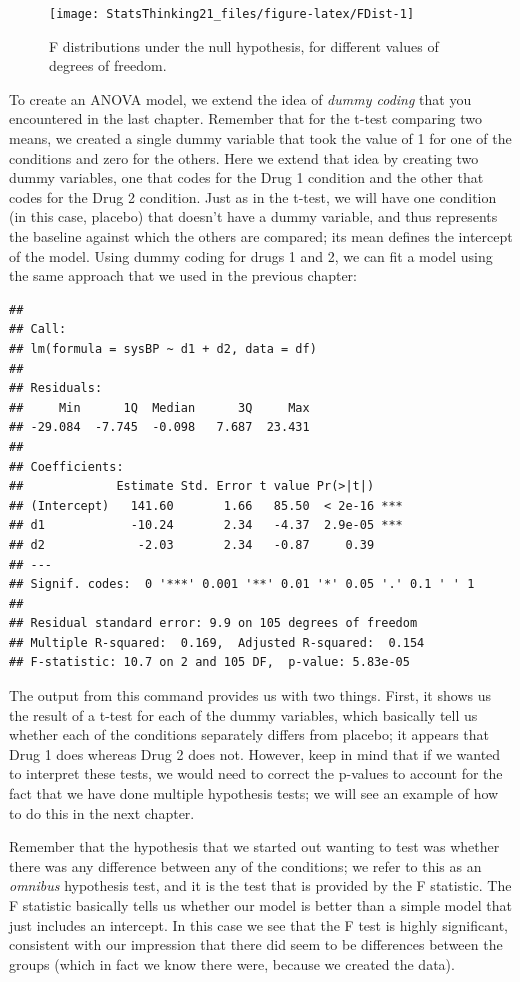 \documentclass[
  12pt,
]{book}
\begin{document}
\begin{figure}
\texttt{[image: StatsThinking21\_files/figure-latex/FDist-1]} \caption{F distributions under the null hypothesis, for different values of degrees of freedom.}\label{fig:FDist}
\end{figure}

To create an ANOVA model, we extend the idea of \emph{dummy coding} that you encountered in the last chapter. Remember that for the t-test comparing two means, we created a single dummy variable that took the value of 1 for one of the conditions and zero for the others. Here we extend that idea by creating two dummy variables, one that codes for the Drug 1 condition and the other that codes for the Drug 2 condition. Just as in the t-test, we will have one condition (in this case, placebo) that doesn't have a dummy variable, and thus represents the baseline against which the others are compared; its mean defines the intercept of the model. Using dummy coding for drugs 1 and 2, we can fit a model using the same approach that we used in the previous chapter:

\begin{verbatim}
## 
## Call:
## lm(formula = sysBP ~ d1 + d2, data = df)
## 
## Residuals:
##     Min      1Q  Median      3Q     Max 
## -29.084  -7.745  -0.098   7.687  23.431 
## 
## Coefficients:
##             Estimate Std. Error t value Pr(>|t|)    
## (Intercept)   141.60       1.66   85.50  < 2e-16 ***
## d1            -10.24       2.34   -4.37  2.9e-05 ***
## d2             -2.03       2.34   -0.87     0.39    
## ---
## Signif. codes:  0 '***' 0.001 '**' 0.01 '*' 0.05 '.' 0.1 ' ' 1
## 
## Residual standard error: 9.9 on 105 degrees of freedom
## Multiple R-squared:  0.169,  Adjusted R-squared:  0.154 
## F-statistic: 10.7 on 2 and 105 DF,  p-value: 5.83e-05
\end{verbatim}

The output from this command provides us with two things. First, it shows us the result of a t-test for each of the dummy variables, which basically tell us whether each of the conditions separately differs from placebo; it appears that Drug 1 does whereas Drug 2 does not. However, keep in mind that if we wanted to interpret these tests, we would need to correct the p-values to account for the fact that we have done multiple hypothesis tests; we will see an example of how to do this in the next chapter.

Remember that the hypothesis that we started out wanting to test was whether there was any difference between any of the conditions; we refer to this as an \emph{omnibus} hypothesis test, and it is the test that is provided by the F statistic. The F statistic basically tells us whether our model is better than a simple model that just includes an intercept. In this case we see that the F test is highly significant, consistent with our impression that there did seem to be differences between the groups (which in fact we know there were, because we created the data).
\end{document}
